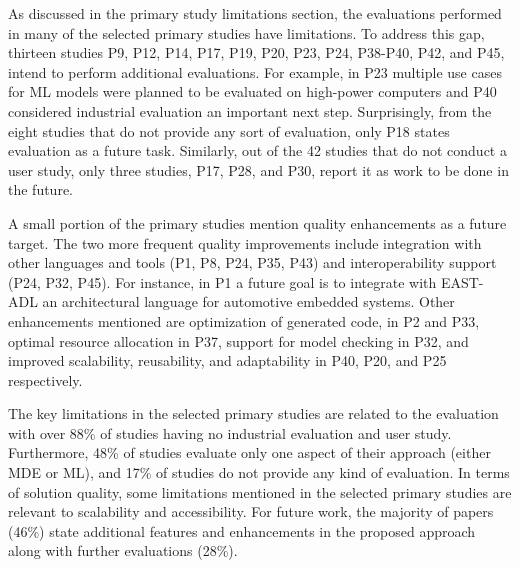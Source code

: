  As discussed in the primary study limitations section, the evaluations performed in many of the selected primary studies have limitations. To address this gap, thirteen studies P9, P12, P14, P17, P19, P20, P23, P24, P38-P40, P42, and P45, intend to perform additional evaluations. For example, in P23 multiple use cases for ML models were planned to be evaluated on high-power computers and P40 considered industrial evaluation an important next step. Surprisingly, from the eight studies that do not provide any sort of evaluation, only P18 states evaluation as a future task. Similarly, out of the 42 studies that do not conduct a user study, only three studies, P17, P28, and P30, report it as work to be done in the future. 

 A small portion of the primary studies mention quality enhancements as a future target. The two more frequent quality improvements include integration with other languages and tools (P1, P8, P24, P35, P43) and interoperability support (P24, P32, P45). For instance, in P1 a future goal is to integrate with EAST-ADL an architectural language for automotive embedded systems. Other enhancements mentioned are optimization of generated code, in P2 and P33, optimal resource allocation in P37, support for model checking in P32, and improved scalability, reusability, and adaptability in P40, P20, and P25 respectively. \\

\begin{center}
\begin{myframe}[width=45em,top=5pt,bottom=5pt,left=5pt,right=5pt,arc=10pt,auto outer arc,title=\centering\textbf{RQ4 Answer Summary}]
\footnotesize
The key limitations in the selected primary studies are related to the evaluation with over 88\% of studies having no industrial evaluation and user study. Furthermore, 48\% of studies evaluate only one aspect of their approach (either MDE or ML), and 17\% of studies do not provide any kind of evaluation. In terms of solution quality, some limitations mentioned in the selected primary studies are relevant to scalability and accessibility. For future work, the majority of papers (46\%) state additional features and enhancements in the proposed approach along with further evaluations (28\%).
    \end{myframe}
\end{center}
\clearpage





